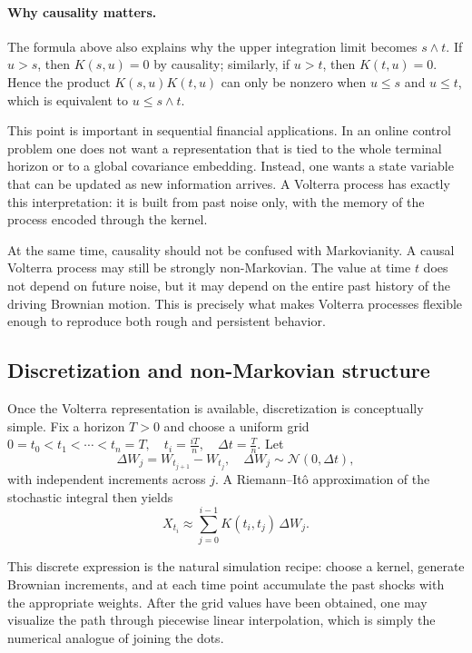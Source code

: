 \paragraph{Why causality matters.}

The formula above also explains why the upper integration limit becomes \(s\wedge t\). If \(u>s\), then \(K(s,u)=0\) by causality; similarly, if \(u>t\), then \(K(t,u)=0\). Hence the product \(K(s,u)K(t,u)\) can only be nonzero when \(u\le s\) and \(u\le t\), which is equivalent to \(u\le s\wedge t\).

This point is important in sequential financial applications. In an online control problem one does not want a representation that is tied to the whole terminal horizon or to a global covariance embedding. Instead, one wants a state variable that can be updated as new information arrives. A Volterra process has exactly this interpretation: it is built from past noise only, with the memory of the process encoded through the kernel.

At the same time, causality should not be confused with Markovianity. A causal Volterra process may still be strongly non-Markovian. The value at time \(t\) does not depend on future noise, but it may depend on the entire past history of the driving Brownian motion. This is precisely what makes Volterra processes flexible enough to reproduce both rough and persistent behavior.

\subsection{Discretization and non-Markovian structure}

Once the Volterra representation is available, discretization is conceptually simple. Fix a horizon \(T>0\) and choose a uniform grid
\(
0=t_0<t_1<\cdots<t_n=T,
\quad
t_i=\frac{iT}{n},
\quad
\Delta t=\frac{T}{n}.
\)
Let
\[
\Delta W_j = W_{t_{j+1}}-W_{t_j},
\quad
\Delta W_j\sim \mathcal{N}(0,\Delta t),
\]
with independent increments across \(j\). A Riemann--It\^o approximation of the stochastic integral then yields
\[
X_{t_i}
\approx
\sum_{j=0}^{i-1} K(t_i,t_j)\,\Delta W_j.
\]

This discrete expression is the natural simulation recipe: choose a kernel, generate Brownian increments, and at each time point accumulate the past shocks with the appropriate weights. After the grid values have been obtained, one may visualize the path through piecewise linear interpolation, which is simply the numerical analogue of joining the dots.

